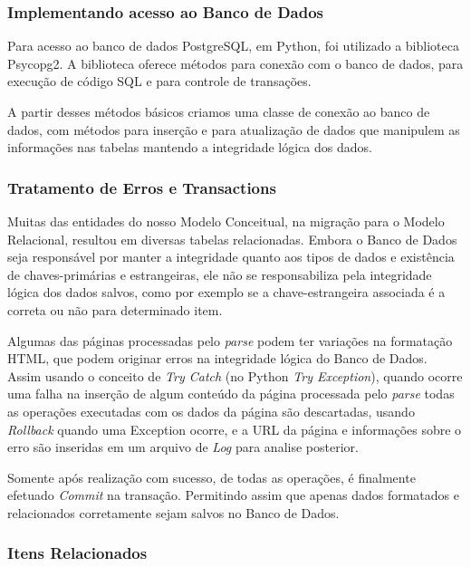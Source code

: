 \documentclass[12pt]{article}
\begin{document}
 
 
\subsubsection{Implementando acesso ao Banco de Dados}

Para acesso ao banco de dados PostgreSQL, em Python, foi utilizado a biblioteca Psycopg2. A biblioteca oferece métodos para conexão com o banco de dados, para execução de código SQL e para controle de transações.

A partir desses métodos básicos criamos uma classe de conexão ao banco de dados, com métodos para inserção e para atualização de dados que manipulem as informações nas tabelas mantendo a integridade lógica dos dados.

\subsubsection{Tratamento de Erros e Transactions}

Muitas das entidades do nosso Modelo Conceitual, na migração para o Modelo Relacional, resultou em diversas tabelas relacionadas. Embora o Banco de Dados seja responsável por manter a integridade quanto aos tipos de dados e existência de chaves-primárias e estrangeiras, ele não se responsabiliza pela integridade lógica dos dados salvos, como por exemplo se a chave-estrangeira associada é a correta ou não para determinado item.

Algumas das páginas processadas pelo \textit{parse} podem ter variações na formatação HTML, que podem originar erros na integridade lógica do Banco de Dados. Assim usando o conceito de \textit{Try Catch} (no Python \textit{Try Exception}), quando ocorre uma falha na inserção de algum conteúdo da página processada pelo \textit{parse} todas as operações executadas com os dados da página são descartadas, usando \textit{Rollback} quando uma Exception ocorre, e a URL da página e informações sobre o erro são inseridas em um arquivo de \textit{Log} para analise posterior.

Somente após realização com sucesso, de todas as operações, é finalmente efetuado \textit{Commit} na transação. Permitindo assim que apenas dados formatados e relacionados corretamente sejam salvos no Banco de Dados.


\subsubsection{Itens Relacionados}
\end{document}
